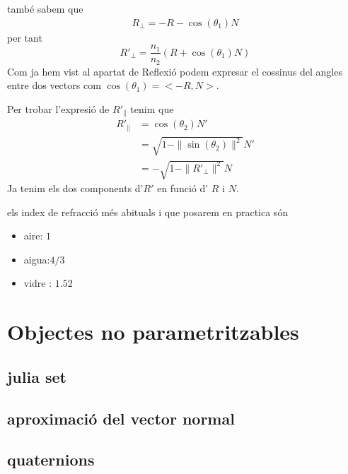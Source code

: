 \documentclass{article}
\begin{document}
també sabem que 
\begin{align*}
   R_{ \bot} = -R-\cos(\theta_1)N
\end{align*}
per tant 
\begin{equation*}
   R'_{ \bot} = \frac{n_1}{n_2} (R+\cos(\theta_1)N)
\end{equation*}
Com ja hem vist al apartat de Reflexió podem expresar el cossinus del angles entre dos vectors com $\cos(\theta_1)= <-R, N>$.

Per trobar l'expresió de $R'_{\parallel}$ tenim que 
\begin{align*}
   R'_{\parallel} &= \cos(\theta_2)N'\\
                  &= \sqrt{1-\|\sin(\theta_2)\|^2} N' \\ 
                  &= -\sqrt{1-\|R'_{\bot}\|^2}N
\end{align*}
Ja tenim els dos components d'$R'$ en funció d' $R$ i  $N$.


els index de refracció més abituals i que posarem en practica són
\begin{itemize}
   \item aire: $1$
   \item aigua:$4 / 3$
   \item vidre : $1.52$
\end{itemize}



\section{Objectes no parametritzables}
\subsection{julia set}
\subsection{aproximació del vector normal}
\subsection{quaternions}
\end{document}
